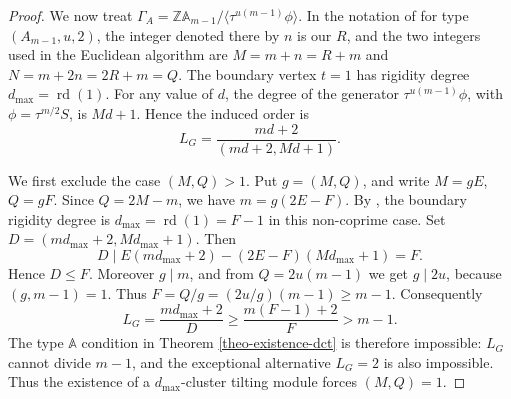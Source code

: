 \documentclass[12pt]{article}
\theoremstyle{plain}
\theoremstyle{definition}
\DeclareMathOperator{\rd}{rd}
\renewcommand{\leq}{\leqslant}
\renewcommand{\geq}{\geqslant}
\begin{document}
\begin{proof}
We now treat \(\Gamma_A=\mathbb Z\mathbb A_{m-1}/
\langle\tau^{u(m-1)}\phi\rangle\).  In the notation of \cite[Theorem 4.1]{HuYinRigidityDegrees} for type
\((A_{m-1},u,2)\), the integer denoted there by \(n\) is our \(R\), and the
two integers used in the Euclidean algorithm are \(M=m+n=R+m\) and
\(N=m+2n=2R+m=Q\).  The boundary vertex \(t=1\) has rigidity degree
\(d_{\max}=\rd(1)\).  
For any value of \(d\), the degree of the generator
\(\tau^{u(m-1)}\phi\), with \(\phi=\tau^{m/2}S\), is \(Md+1\).  Hence the induced order is
\[
L_G=\frac{md+2}{(md+2,Md+1)}.
\]

We first exclude the case \((M,Q)>1\).  Put \(g=(M,Q)\), and write
\(M=gE\), \(Q=gF\).  Since \(Q=2M-m\), we have \(m=g(2E-F)\).  By
\cite[Theorem 4.1]{HuYinRigidityDegrees}, the boundary rigidity degree is
\(d_{\max}=\rd(1)=F-1\) in this non-coprime case.  Set
\(D=(md_{\max}+2,Md_{\max}+1)\).  Then
\[
D\mid E(md_{\max}+2)-(2E-F)(Md_{\max}+1)=F.
\]
Hence \(D\leq F\).  Moreover \(g\mid m\), and from
\(Q=2u(m-1)\) we get \(g\mid2u\), because \((g,m-1)=1\).  Thus
\(
F=Q/g=(2u/g)(m-1)\geq m-1\). 
Consequently
\[
L_G=\frac{md_{\max}+2}{D}\geq\frac{m(F-1)+2}{F}>m-1.
\]
The type \(\mathbb A\) condition in Theorem \ref{theo-existence-dct} is
therefore impossible: \(L_G\) cannot divide \(m-1\), and the exceptional
alternative \(L_G=2\) is also impossible.  Thus the existence of a
\(d_{\max}\)-cluster tilting module forces \((M,Q)=1\).


\end{proof}
\end{document}
